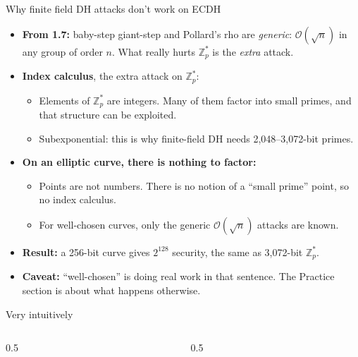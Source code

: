 \ifdefined\PRESENTATION\else\PassOptionsToClass{handout}{beamer}\fi\documentclass[aspectratio=169, lualatex]{beamer}
\begin{document}
\begin{frame}{Why finite field DH attacks don't work on ECDH}
	\begin{itemize}[<+->]
		\item \textbf{From 1.7:} baby-step giant-step and Pollard's rho are \emph{generic}: $\mathcal{O}(\sqrt{n})$ in any group of order $n$. What really hurts $\mathbb{Z}_p^*$ is the \emph{extra} attack.
		\item \textbf{Index calculus}, the extra attack on $\mathbb{Z}_p^*$:
		      \begin{itemize}
			      \item Elements of $\mathbb{Z}_p^*$ are integers. Many of them factor into small primes, and that structure can be exploited.
			      \item Subexponential: this is why finite-field DH needs 2,048--3,072-bit primes.
		      \end{itemize}
		\item \textbf{On an elliptic curve, there is nothing to factor:}
		      \begin{itemize}
			      \item Points are not numbers. There is no notion of a ``small prime'' point, so no index calculus.
			      \item For well-chosen curves, only the generic $\mathcal{O}(\sqrt{n})$ attacks are known.
		      \end{itemize}
		\item \textbf{Result:} a 256-bit curve gives $2^{128}$ security, the same as 3,072-bit $\mathbb{Z}_p^*$.
		\item \textbf{Caveat:} ``well-chosen'' is doing real work in that sentence. The Practice section is about what happens otherwise.
	\end{itemize}
\end{frame}

\begin{frame}{Very intuitively}
	\begin{columns}
		\begin{column}{0.5\textwidth}
		\end{column}
		\begin{column}{0.5\textwidth}
		\end{column}
	\end{columns}
\end{frame}
\end{document}
